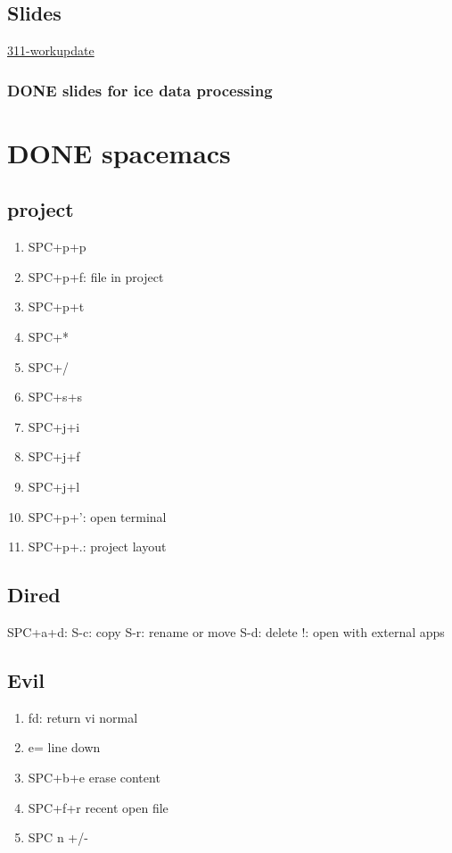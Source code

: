 \documentclass[11pt]{article}
\begin{document}
\subsection{Slides}
\label{sec:orgc3c0938}
\href{file:///home/xin/Documents/SLD/work-update/group-discussion.key}{311-workupdate}

\subsubsection{{\bfseries\sffamily DONE} slides for ice data processing}
\label{sec:org028e262}
\section{{\bfseries\sffamily DONE} spacemacs}
\label{sec:orgdfa1bc7}
\subsection{project}
\label{sec:orgb29b509}
\begin{enumerate}
\item SPC+p+p
\item SPC+p+f: file in project
\item SPC+p+t
\item SPC+*
\item SPC+/
\item SPC+s+s
\item SPC+j+i
\item SPC+j+f
\item SPC+j+l
\item SPC+p+': open terminal
\item SPC+p+.: project layout
\end{enumerate}
\subsection{Dired}
\label{sec:orgbea320c}
SPC+a+d:
S-c: copy
S-r: rename or move
S-d: delete
!: open with external apps
\subsection{Evil}
\label{sec:org426b7c4}
\begin{enumerate}
\item fd: return vi normal
\item\relax [ e= line up
\item ] e= line down
\item SPC+b+e erase content
\item SPC+f+r recent open file
\item SPC n +/-
\end{enumerate}
\end{document}
